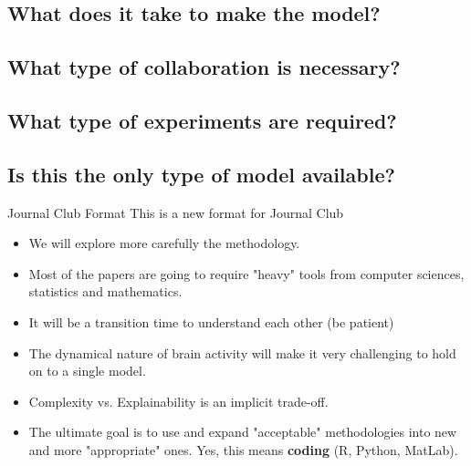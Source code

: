 \documentclass{beamer}
\begin{document}
\subsection{What does it take to make the model?}

\subsection{What type of collaboration is necessary?}

\subsection{What type of experiments are required?}

\subsection{Is this the only type of model available?}

	


\begin{frame}{Journal Club Format}
	This is a new format for Journal Club
	\begin{itemize}
		\item We will explore more carefully the methodology.
		\item Most of the papers are going to require "heavy" tools from computer sciences, statistics and mathematics. 
		\item It will be a transition time to understand each other (be patient)
		\item The dynamical nature of brain activity will make it very challenging to hold on to a single model. 
		\item Complexity vs. Explainability is an implicit trade-off. 
		\item The ultimate goal is to use and expand "acceptable" methodologies into new and more "appropriate" ones. Yes, this means \textbf{coding} (R, Python, MatLab).
	\end{itemize} 
\end{frame}
\end{document}
